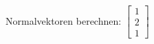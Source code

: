 \documentclass[preview]{standalone}
\begin{document}
\begin{center}
Normalvektoren berechnen: $\begin{bmatrix} 1 \\ 2 \\ 1 \end{bmatrix}$
\end{center}
\end{document}
